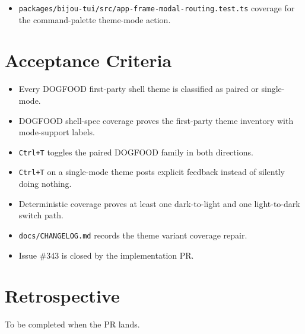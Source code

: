 \begin{itemize}
\item
  \texttt{p\allowbreak{}a\allowbreak{}c\allowbreak{}k\allowbreak{}a\allowbreak{}g\allowbreak{}e\allowbreak{}s\allowbreak{}/\allowbreak{}b\allowbreak{}i\allowbreak{}j\allowbreak{}o\allowbreak{}u\allowbreak{}-\allowbreak{}t\allowbreak{}u\allowbreak{}i\allowbreak{}/\allowbreak{}s\allowbreak{}r\allowbreak{}c\allowbreak{}/\allowbreak{}a\allowbreak{}p\allowbreak{}p\allowbreak{}-\allowbreak{}f\allowbreak{}r\allowbreak{}a\allowbreak{}m\allowbreak{}e\allowbreak{}-\allowbreak{}m\allowbreak{}o\allowbreak{}d\allowbreak{}a\allowbreak{}l\allowbreak{}-\allowbreak{}r\allowbreak{}o\allowbreak{}u\allowbreak{}t\allowbreak{}i\allowbreak{}n\allowbreak{}g\allowbreak{}.\allowbreak{}t\allowbreak{}e\allowbreak{}s\allowbreak{}t\allowbreak{}.\allowbreak{}t\allowbreak{}s} coverage for the command-palette theme-mode action.
\end{itemize}

\section{Acceptance Criteria}\label{record-183-acceptance-criteria}

\begin{itemize}
\tightlist
\item
  Every DOGFOOD first-party shell theme is classified as paired or single-mode.
\item
  DOGFOOD shell-spec coverage proves the first-party theme inventory with mode-support labels.
\item
  \texttt{C\allowbreak{}t\allowbreak{}r\allowbreak{}l\allowbreak{}+\allowbreak{}T} toggles the paired DOGFOOD family in both directions.
\item
  \texttt{C\allowbreak{}t\allowbreak{}r\allowbreak{}l\allowbreak{}+\allowbreak{}T} on a single-mode theme posts explicit feedback instead of silently doing nothing.
\item
  Deterministic coverage proves at least one dark-to-light and one light-to-dark switch path.
\item
  \texttt{d\allowbreak{}o\allowbreak{}c\allowbreak{}s\allowbreak{}/\allowbreak{}C\allowbreak{}H\allowbreak{}A\allowbreak{}N\allowbreak{}G\allowbreak{}E\allowbreak{}L\allowbreak{}O\allowbreak{}G\allowbreak{}.\allowbreak{}m\allowbreak{}d} records the theme variant coverage repair.
\item
  Issue \#343 is closed by the implementation PR.
\end{itemize}

\section{Retrospective}\label{record-183-retrospective}

To be completed when the PR lands.


